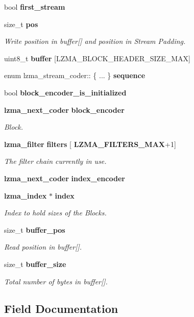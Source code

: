 \begin{DoxyCompactItemize}
bool \textbf{ first\+\_\+stream}
\item 
size\+\_\+t \textbf{ pos}
\begin{DoxyCompactList}\small\item\em Write position in buffer[] and position in Stream Padding. \end{DoxyCompactList}\item 
uint8\+\_\+t \textbf{ buffer} [L\+Z\+M\+A\+\_\+\+B\+L\+O\+C\+K\+\_\+\+H\+E\+A\+D\+E\+R\+\_\+\+S\+I\+Z\+E\+\_\+\+M\+AX]
\item 
\mbox{\label{structlzma__stream__coder_abba3a77effec0653065a17b6f1dabb17}} 
enum lzma\+\_\+stream\+\_\+coder\+:: \{ ... \}  {\bfseries sequence}
\item 
bool \textbf{ block\+\_\+encoder\+\_\+is\+\_\+initialized}
\item 
\textbf{ lzma\+\_\+next\+\_\+coder} \textbf{ block\+\_\+encoder}
\begin{DoxyCompactList}\small\item\em Block. \end{DoxyCompactList}\item 
\textbf{ lzma\+\_\+filter} \textbf{ filters} [\textbf{ L\+Z\+M\+A\+\_\+\+F\+I\+L\+T\+E\+R\+S\+\_\+\+M\+AX}+1]
\begin{DoxyCompactList}\small\item\em The filter chain currently in use. \end{DoxyCompactList}\item 
\textbf{ lzma\+\_\+next\+\_\+coder} \textbf{ index\+\_\+encoder}
\item 
\textbf{ lzma\+\_\+index} $\ast$ \textbf{ index}
\begin{DoxyCompactList}\small\item\em Index to hold sizes of the Blocks. \end{DoxyCompactList}\item 
size\+\_\+t \textbf{ buffer\+\_\+pos}
\begin{DoxyCompactList}\small\item\em Read position in buffer[]. \end{DoxyCompactList}\item 
size\+\_\+t \textbf{ buffer\+\_\+size}
\begin{DoxyCompactList}\small\item\em Total number of bytes in buffer[]. \end{DoxyCompactList}\end{DoxyCompactItemize}


\subsection{Field Documentation}
\mbox{\label{structlzma__stream__coder_abae359673dac6cc59904970e8d1a651c}} 
